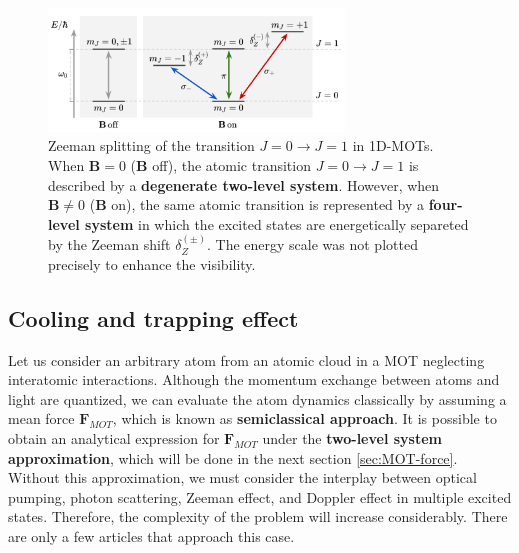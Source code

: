 \begin{figure}[!ht]
	\centering
	\includegraphics[width=0.7\textwidth]{USPSC-img/1D-MOT-Zeeman-splitting.png}
	\vspace{5pt}
	\caption{Zeeman splitting of the transition $ J = 0 \rightarrow J = 1 $ in 1D-MOTs. When $ \mathbf{B} = 0 $ ($\mathbf{B}$ off), the atomic transition $ J = 0 \rightarrow J = 1 $ is described by a \textbf{degenerate two-level system}. However, when $ \mathbf{B} \neq 0 $ ($\mathbf{B}$ on), the same atomic transition is represented by a \textbf{four-level system} in which the excited states are energetically separeted by the Zeeman shift $ \delta_{Z}^{(\pm)} $. The energy scale was not plotted precisely to enhance the visibility.}
	\label{fig:1D-MOT-Zeeman-splitting}
\end{figure}

\subsection{Cooling and trapping effect}
\label{sec:cooling-trapping-effect}

Let us consider an arbitrary atom from an atomic cloud in a MOT neglecting interatomic interactions. Although the momentum exchange between atoms and light are quantized, we can evaluate the atom dynamics classically by assuming a mean force $ \mathbf{F}_{MOT} $, which is known as \textbf{semiclassical approach}. It is possible to obtain an analytical expression for $ \mathbf{F}_{MOT} $ under the \textbf{two-level system approximation}, which will be done in the next section \ref{sec:MOT-force}. Without this approximation, we must consider the interplay between optical pumping, photon scattering, Zeeman effect, and Doppler effect in multiple excited states. Therefore, the complexity of the problem will increase considerably. There are only a few articles \cite{prudnikov2015three, choi2008three, PhysRevA.49.4864} that approach this case.

